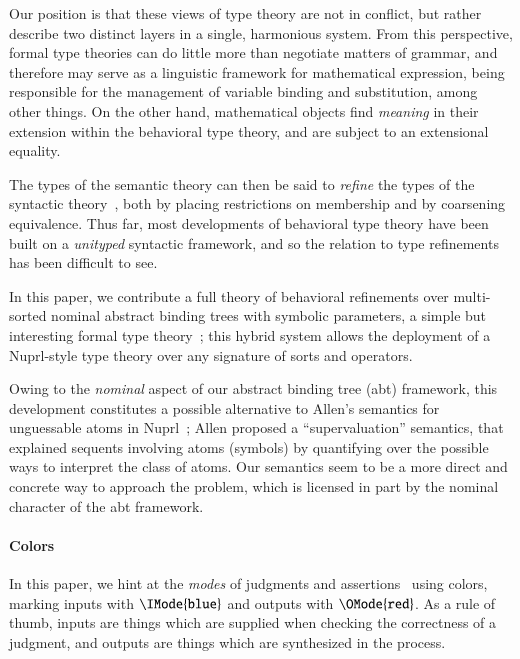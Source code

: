 \documentclass[11pt]{article}
\theoremstyle{definition}
\theoremstyle{notation}
\theoremstyle{remark}
\numberwithin{equation}{section}
\begin{document}
Our position is that these views of type theory are not in conflict, but rather
describe two distinct layers in a single, harmonious system. From this
perspective, formal type theories can do little more than negotiate matters of
grammar, and therefore may serve as a linguistic framework for mathematical
expression, being responsible for the management of variable binding and
substitution, among other things. On the other hand, mathematical objects find
\emph{meaning} in their extension within the behavioral type theory, and are
subject to an extensional equality.

The types of the semantic theory can then be said to \emph{refine} the types of
the syntactic theory~\cite{harper-davies:2014, harper-duff:2015, harper:2016},
both by placing restrictions on membership and by coarsening equivalence. Thus
far, most developments of behavioral type theory have been built on a
\emph{unityped} syntactic framework, and so the relation to type refinements
has been difficult to see.

In this paper, we contribute a full theory of behavioral refinements over
multi-sorted nominal abstract binding trees with symbolic parameters, a simple
but interesting formal type theory~\cite{harper:2016, sterling-morrison:2015};
this hybrid system allows the deployment of a Nuprl-style type theory over any
signature of sorts and operators.

Owing to the \emph{nominal} aspect of our abstract binding tree (abt) framework, this
development constitutes a possible alternative to Allen's semantics for
unguessable atoms in Nuprl~\cite{allen:2006}; Allen proposed a
``supervaluation'' semantics, that explained sequents involving atoms (symbols)
by quantifying over the possible ways to interpret the class of atoms. Our
semantics seem to be a more direct and concrete way to approach the problem,
which is licensed in part by the nominal character of the abt framework.

\ifcolored%
\paragraph{Colors}
In this paper, we hint at the \emph{modes} of judgments and
assertions~\cite{harper:2016} using colors, marking inputs with
$\IMode{\texttt{blue}}$ and outputs with $\OMode{\texttt{red}}$. As a rule of
thumb, inputs are things which are supplied when checking the correctness of a
judgment, and outputs are things which are synthesized in the process. \fi
\end{document}
